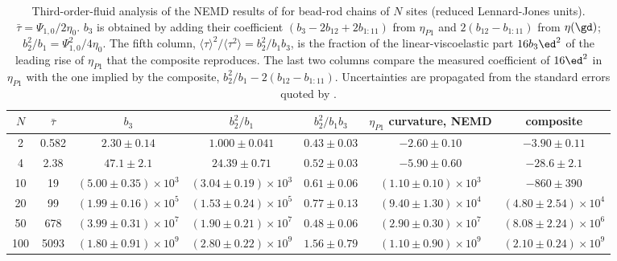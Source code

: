 \begin{table}
\caption{Third-order-fluid analysis of the NEMD results of \cite{Daivis2007} for bead-rod chains of $N$ sites (reduced Lennard-Jones units). $\bar\tau=\Psi_{1,0}/2\eta_0$. $b_3$ is obtained by adding their coefficient $(b_3-2b_{12}+2b_{1:11})$ from $\eta_{P1}$ and $2(b_{12}-b_{1:11})$ from $\eta(\gd)$; $b_2^2/b_1=\Psi_{1,0}^2/4\eta_0$. The fifth column, $\langle\tau\rangle^2/\langle\tau^2\rangle=b_2^2/b_1b_3$, is the fraction of the linear-viscoelastic part $16b_3\ed^2$ of the leading rise of $\eta_{P1}$ that the composite reproduces. The last two columns compare the measured coefficient of $16\ed^2$ in $\eta_{P1}$ with the one implied by the composite, $b_2^2/b_1-2(b_{12}-b_{1:11})$. Uncertainties are propagated from the standard errors quoted by \cite{Daivis2007}.}\label{tab:nemd}
\footnotesize
\begin{ruledtabular}
\begin{tabular}{ccccccc}
$N$ & $\bar\tau$ & $b_3$ & $b_2^2/b_1$ & $b_2^2/b_1b_3$ & $\eta_{P1}$ curvature, NEMD & composite\\
\hline
2 & 0.582 & $2.30\pm0.14$ & $1.000\pm0.041$ & $0.43\pm0.03$ & $-2.60\pm0.10$ & $-3.90\pm0.11$\\
4 & 2.38 & $47.1\pm2.1$ & $24.39\pm0.71$ & $0.52\pm0.03$ & $-5.90\pm0.60$ & $-28.6\pm2.1$\\
10 & 19 & $(5.00\pm0.35)\times10^{3}$ & $(3.04\pm0.19)\times10^{3}$ & $0.61\pm0.06$ & $(1.10\pm0.10)\times10^{3}$ & $-860\pm390$\\
20 & 99 & $(1.99\pm0.16)\times10^{5}$ & $(1.53\pm0.24)\times10^{5}$ & $0.77\pm0.13$ & $(9.40\pm1.30)\times10^{4}$ & $(4.80\pm2.54)\times10^{4}$\\
50 & 678 & $(3.99\pm0.31)\times10^{7}$ & $(1.90\pm0.21)\times10^{7}$ & $0.48\pm0.06$ & $(2.90\pm0.30)\times10^{7}$ & $(8.08\pm2.24)\times10^{6}$\\
100 & 5093 & $(1.80\pm0.91)\times10^{9}$ & $(2.80\pm0.22)\times10^{9}$ & $1.56\pm0.79$ & $(1.10\pm0.90)\times10^{9}$ & $(2.10\pm0.24)\times10^{9}$\\
\end{tabular}
\end{ruledtabular}
\end{table}
